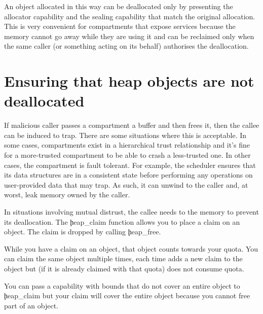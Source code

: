 An object allocated in this way can be deallocated only by presenting  the allocator capability and the sealing capability that match the original allocation.
This is very convenient for compartments that expose services because the memory cannot go away while they are using it and can be reclaimed only when the same caller (or something acting on its behalf) authorises the deallocation.

\section[label=heap_claim]{Ensuring that heap objects are not deallocated}

If malicious caller passes a compartment a buffer and then frees it, then the callee can be induced to trap.
There are some situations where this is acceptable.
In some cases, compartments exist in a hierarchical trust relationship and it's fine for a more-trusted compartment to be able to crash a less-trusted one.
In other cases, the compartment is fault tolerant.
For example, the scheduler ensures that its data structures are in a consistent state before performing any operations on user-provided data that may trap.
As such, it can unwind to the caller and, at worst, leak memory owned by the caller.

In situations involving mutual distrust, the callee needs to  the memory to prevent its deallocation.
The \c{heap_claim} function allows you to place a claim on an object.
The claim is dropped by calling \c{heap_free}.

While you have a claim on an object, that object counts towards your quota.
You can claim the same object multiple times, each time adds a new claim to the object but (if it is already claimed with that quota) does not consume quota.

\begin{note}
You can pass a capability with bounds that do not cover an entire object to \c{heap_claim} but your claim will cover the entire object because you cannot free part of an object.
\end{note}

